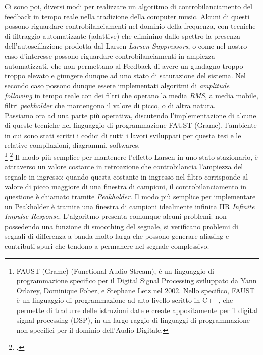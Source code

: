 Ci sono poi, diversi modi per realizzare un algoritmo di controbilanciamento del feedback in tempo
reale nella tradizione della computer music.
Alcuni di questi possono riguardare controbilanciamenti nel dominio della frequenza,
con tecniche di filtraggio automatizzate (adattive) che
eliminino dallo spettro la presenza dell'autoscillazione prodotta dal Larsen \textit{Larsen Suppressors},
o come nel nostro caso d’interesse possono riguardare controbilanciamenti in ampiezza
automatizzati, che non permettano al Feedback di avere un guadagno troppo troppo elevato 
e giungere dunque ad uno stato di saturazione del sistema.
Nel secondo caso possono dunque essere implementati algoritmi di \textit{amplitude following} in
tempo reale con dei filtri che operano la media \textit{RMS}, a media mobile, 
filtri \textit{peakholder} che mantengono il valore di picco, o di altra natura. \\
Passiamo ora ad una parte più operativa, discutendo l'implementazione
di alcune di queste tecniche nel linguaggio di programmazione FAUST (Grame), 
l'ambiente in cui sono stati scritti i codici di tutti i lavori sviluppati 
per questa tesi e le relative compilazioni, diagrammi, softwares. \\
\footnote{FAUST (Grame) (Functional Audio Stream), 
è un linguaggio di programmazione specifico per il Digital Signal
Processing sviluppato da Yann Orlarey, Dominique Fober, e Stephane Letz nel
2002. Nello specifico, FAUST è un linguaggio di programmazione ad alto livello
scritto in C++, che permette di tradurre delle istruzioni date e create 
appositamente per il digital signal processing (DSP), in un largo raggio di linguaggi
di programmazione non specifici per il dominio dell’Audio Digitale.} \footcite{https://faust.grame.fr/}
Il modo più semplice per mantenere l’effetto Larsen in uno stato stazionario, è attraverso un
valore costante in retroazione che controbilancia l’ampiezza del segnale in ingresso; 
quando questa costante in ingresso nel filtro corrisponde al valore di picco maggiore 
di una finestra di campioni, il controbilanciamento in questione è chiamato tramite \textit{Peakholder}.
Il modo più semplice per implementare un Peakholder è tramite una finestra 
di campioni idealmente infinita IIR \textit{Infinite Impulse Response}. 
L’algoritmo presenta comunque alcuni problemi: non possedendo
una funzione di smoothing del segnale, si verificano problemi di segnali di differenza a banda
molto larga che possono generare aliasing e contributi spuri che tendono a permanere nel
segnale complessivo.




